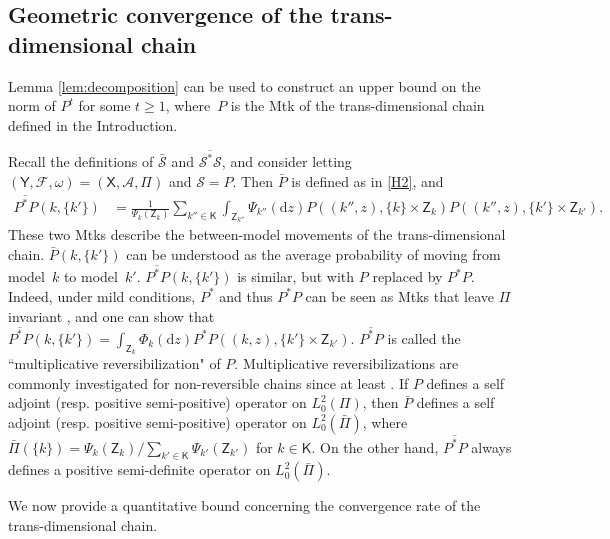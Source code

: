 \documentclass[12pt]{article}
\newcommand{\df}{\mathrm{d}}
\newcommand{\X}{\mathsf{X}}
\newcommand{\Y}{\mathsf{Y}}
\newcommand{\Z}{\mathsf{Z}}
\newcommand{\SF}{\mathcal{A}}
\newcommand{\F}{\mathcal{F}}
\newcommand{\mtkfont}{\mathcal}
\newtheorem{remark}[theorem]{Remark}
\begin{document}
\subsection{Geometric convergence of the trans-dimensional chain} \label{ssec:geometric}

Lemma \ref{lem:decomposition} can be used to construct an upper bound on the norm of $P^t$ for some $t \geq 1$, where~$P$ is the Mtk of the trans-dimensional chain defined in the Introduction.


{
Recall the definitions of $\bar{\mtkfont{S}}$ and $\overline{\mtkfont{S}^*\mtkfont{S}}$, and consider letting $(\Y,\F,\omega) = (\X, \SF, \Pi)$ and $\mtkfont{S} = P$.
Then $\bar{P}$ is defined as in \ref{H2}, and
\[
\begin{aligned}
	\overline{P^*P}(k,\{k'\}) &= \frac{1}{\Psi_k(\Z_k)} \sum_{k'' \in \mathsf{K}} \int_{\Z_{k''}} \Psi_{k''}(\df z) P((k'',z), \{k\} \times \Z_k ) P((k'',z), \{k'\} \times \Z_{k'}).
\end{aligned}
\]
These two Mtks describe the between-model movements of the trans-dimensional chain.
$\bar{P}(k,\{k'\})$ can be understood as the average probability of moving from model~$k$ to model~$k'$.
$\overline{P^*P}(k,\{k'\})$ is similar, but with $P$ replaced by $P^*P$. 
Indeed, under mild conditions, $P^*$ and thus $P^*P$ can be seen as Mtks that leave $\Pi$ invariant \citep{paulin2015concentration,choi2020metropolis}, and one can show that
$
\overline{P^*P}(k,\{k'\}) = \int_{\Z_k} \Phi_k(\df z) P^*P((k,z), \{k'\} \times \Z_{k'}) .
$
$\overline{P^*P}$ is called the ``multiplicative reversibilization" of $P$. 
Multiplicative reversibilizations are commonly investigated for non-reversible chains since at least \cite{fill1991eigenvalue}.
If $P$ defines a self adjoint (resp. positive semi-positive) operator on $L_0^2(\Pi)$, then $\bar{P}$ defines a self adjoint (resp. positive semi-positive) operator on $L_0^2(\bar{\Pi})$, where $\bar{\Pi}(\{k\}) = \Psi_k(\Z_k)/\sum_{k' \in \mathsf{K}} \Psi_{k'}(\Z_{k'})$ for $k \in \mathsf{K}$.
On the other hand, $\overline{P^*P}$ always defines a positive semi-definite operator on $L_0^2(\bar{\Pi})$.
}

We now provide a quantitative bound concerning the convergence rate of the trans-dimensional chain.

\end{document}
